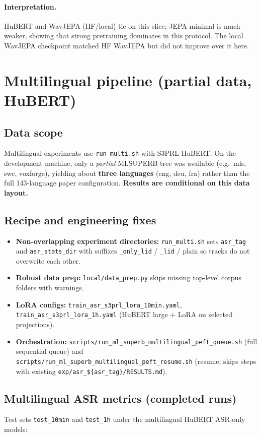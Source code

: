 \documentclass[11pt,a4paper]{article}
\begin{document}
\paragraph{Interpretation.}
HuBERT and WavJEPA (HF/local) tie on this slice; JEPA minimal is much weaker, showing that strong pretraining dominates in this protocol. The local WavJEPA checkpoint matched HF WavJEPA but did not improve over it here.

\section{Multilingual pipeline (partial data, HuBERT)}
\subsection{Data scope}
Multilingual experiments use \texttt{run\_multi.sh} with S3PRL HuBERT. On the development machine, only a \emph{partial} MLSUPERB tree was available (e.g.\ mls, swc, voxforge), yielding about \textbf{three languages} (eng, deu, fra) rather than the full 143-language paper configuration. \textbf{Results are conditional on this data layout.}

\subsection{Recipe and engineering fixes}
\begin{itemize}[leftmargin=*]
    \item \textbf{Non-overlapping experiment directories:} \texttt{run\_multi.sh} sets \texttt{asr\_tag} and \texttt{asr\_stats\_dir} with suffixes \texttt{\_only\_lid} / \texttt{\_lid} / plain so tracks do not overwrite each other.
    \item \textbf{Robust data prep:} \texttt{local/data\_prep.py} skips missing top-level corpus folders with warnings.
    \item \textbf{LoRA configs:} \texttt{train\_asr\_s3prl\_lora\_10min.yaml}, \texttt{train\_asr\_s3prl\_lora\_1h.yaml} (HuBERT large + LoRA on selected projections).
    \item \textbf{Orchestration:} \texttt{scripts/run\_ml\_superb\_multilingual\_peft\_queue.sh} (full sequential queue) and \texttt{scripts/run\_ml\_superb\_multilingual\_peft\_resume.sh} (resume; skips steps with existing \texttt{exp/asr\_\$\{asr\_tag\}/RESULTS.md}).
\end{itemize}

\subsection{Multilingual ASR metrics (completed runs)}
Test sets \texttt{test\_10min} and \texttt{test\_1h} under the multilingual HuBERT ASR-only models:
\end{document}
